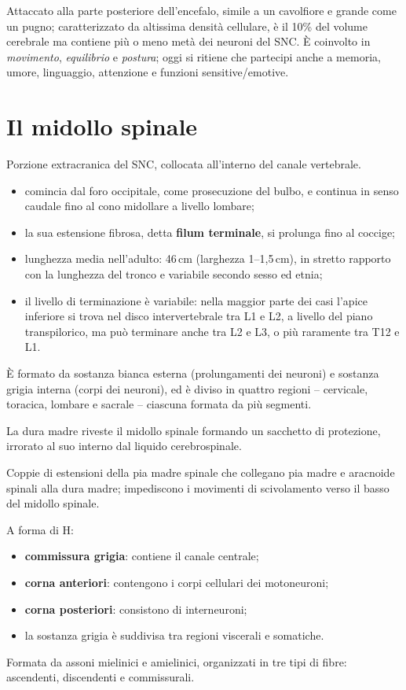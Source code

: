 Attaccato alla parte posteriore dell'encefalo, simile a un cavolfiore e
grande come un pugno; caratterizzato da altissima densità cellulare, è il
10\% del volume cerebrale ma contiene più o meno metà dei neuroni del SNC.
È coinvolto in \textit{movimento}, \textit{equilibrio} e \textit{postura};
oggi si ritiene che partecipi anche a memoria, umore, linguaggio, attenzione
e funzioni sensitive/emotive.

\section{Il midollo spinale}

Porzione extracranica del SNC, collocata all'interno del canale vertebrale.

\begin{itemize}
  \item comincia dal foro occipitale, come prosecuzione del bulbo, e continua
    in senso caudale fino al cono midollare a livello lombare;
  \item la sua estensione fibrosa, detta \textbf{filum terminale}, si
    prolunga fino al coccige;
  \item lunghezza media nell'adulto: 46\,cm (larghezza 1--1,5\,cm), in
    stretto rapporto con la lunghezza del tronco e variabile secondo sesso ed
    etnia;
  \item il livello di terminazione è variabile: nella maggior parte dei casi
    l'apice inferiore si trova nel disco intervertebrale tra L1 e L2, a
    livello del piano transpilorico, ma può terminare anche tra L2 e L3, o
    più raramente tra T12 e L1.
\end{itemize}

È formato da sostanza bianca esterna (prolungamenti dei neuroni) e sostanza
grigia interna (corpi dei neuroni), ed è diviso in quattro regioni --
cervicale, toracica, lombare e sacrale -- ciascuna formata da più segmenti.

La dura madre riveste il midollo spinale formando un sacchetto di protezione,
irrorato al suo interno dal liquido cerebrospinale.

Coppie di estensioni della pia madre spinale che collegano pia madre e
aracnoide spinali alla dura madre; impediscono i movimenti di scivolamento
verso il basso del midollo spinale.

A forma di H:
\begin{itemize}
  \item \textbf{commissura grigia}: contiene il canale centrale;
  \item \textbf{corna anteriori}: contengono i corpi cellulari dei
    motoneuroni;
  \item \textbf{corna posteriori}: consistono di interneuroni;
  \item la sostanza grigia è suddivisa tra regioni viscerali e somatiche.
\end{itemize}

Formata da assoni mielinici e amielinici, organizzati in tre tipi di fibre:
ascendenti, discendenti e commissurali.
